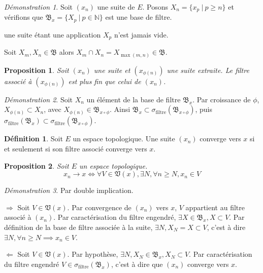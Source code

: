 \documentclass[a4paper, 11pt, french]{book}
\newenvironment{itemise}{\itemize}{\enditemize}
\theoremstyle{plain} %
\newtheorem{proposition}{Proposition}
\theoremstyle{definition} %
\newtheorem{definition}{Définition}
\theoremstyle{remark} %
\newtheorem*{demonstration}{Démonstration}
\newcommand{\1}{\mathds{1}}
\newcommand{\N}{\mathbb{N}}
\renewcommand{\frak}[1]{\mathfrak{#1}}
\newcommand{\rm}[1]{\mathrm{#1}}
\newcommand\ens[2]{\{#1 \ |\ #2\}}
\newcommand\equivalence[3]{
	\begin{demonstration}
		#1
		\begin{itemise}
			\item[$\Longrightarrow$] #2
			\item[$\Longleftarrow$] #3
		\end{itemise}
	\end{demonstration}
}
\begin{document}
\begin{demonstration}
	Soit $(x_n)$ une suite de $E$.
	Posons $X_n=\ens{x_p}{p\geqslant n}$ et vérifions que $\frak{B}_x=\ens{X_p}{p\in\N}$ est une base de filtre.
	\begin{itemise}
		\item une suite étant une application $X_p$ n'est jamais vide.
		\item Soit $X_m, X_n\in\frak{B}$ alors $X_m\cap X_n=X_{\max(m, n)}\in\frak{B}$.
	\end{itemise}
\end{demonstration}

\begin{proposition}
	Soit $(x_n)$ une suite et $(x_{\phi(n)})$ une suite extraite.
	Le filtre associé à $(x_{\phi(n)})$ est plus fin que celui de $(x_n)$.
\end{proposition}

\begin{demonstration}
	Soit $X_n$ un élément de la base de filtre $\frak{B}_x$.
	Par croissance de $\phi$, $X_{\phi(n)}\subset X_n$, avec $X_{\phi(n)}\in\frak{B}_{x\circ\phi}$.
	Ainsi $\frak{B}_x\subset\sigma_\rm{filtre}(\frak{B}_{x\circ\phi})$, puis $\sigma_\rm{filtre}(\frak{B}_x)\subset\sigma_\rm{filtre}(\frak{B}_{x\circ\phi})$.
\end{demonstration}

\begin{definition}
	Soit $E$ un espace topologique.
	Une suite $(x_n)$ converge vers $x$ si et seulement si son filtre associé converge vers $x$.
\end{definition}

\begin{proposition}
	Soit $E$ un espace topologique.
	$$
	x_n\rightarrow x
	\iff
	\forall V\in\frak{V}(x), \exists N, \forall n\geqslant N, x_n\in V
	$$
\end{proposition}

\equivalence{Par double implication.}{
	Soit $V\in\frak{V}(x)$.
	Par convergence de $(x_n)$ vers $x$, $V$ appartient au filtre associé à $(x_n)$.
	Par caractérisation du filtre engendré, $\exists X\in\frak{B}_x, X\subset V$.
	Par définition de la base de filtre associée à la suite, $\exists N, X_N=X\subset V$, c'est à dire $\exists N, \forall n\geqslant N\implies x_n\in V$.
}{
	Soit $V\in\frak{V}(x)$.
	Par hypothèse, $\exists N, X_N\in\frak{B}_x, X_N\subset V$.
	Par caractérisation du filtre engendré $V\in\sigma_\rm{filtre}(\frak{B}_x)$, c'est à dire que $(x_n)$ converge vers $x$.	
}
\end{document}
